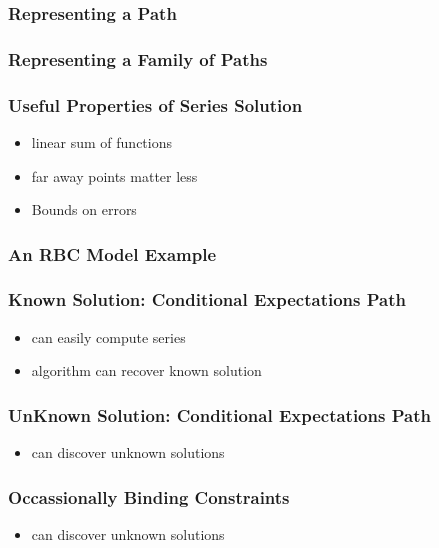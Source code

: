 \documentclass[tikz]{beamer}
\begin{document}
\begin{frame}
\frametitle{Representing a Path}

\end{frame}
\begin{frame}
\frametitle{Representing a Family of Paths}

\end{frame}

\begin{frame}
\frametitle{Useful Properties of Series Solution}

\begin{itemize}
\item linear sum of functions
\item far away points matter less
\item Bounds on errors
\end{itemize}



\end{frame}



\begin{frame}
\frametitle{An RBC Model Example}
\end{frame}
\begin{frame}
\frametitle{Known Solution: Conditional Expectations Path}
\begin{itemize}
\item can easily compute series
\item algorithm can recover known solution
\end{itemize}


\end{frame}




\begin{frame}
\frametitle{UnKnown Solution: Conditional Expectations Path}
\begin{itemize}
\item can discover unknown solutions
\end{itemize}



\end{frame}



\begin{frame}
\frametitle{Occassionally Binding Constraints}
\begin{itemize}
\item can discover unknown solutions
\end{itemize}



\end{frame}
\end{document}
